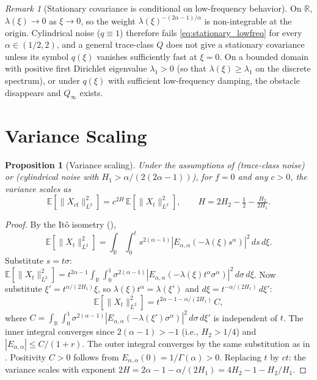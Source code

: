 \documentclass[11pt]{article}
\newtheorem{proposition}[theorem]{Proposition}
\theoremstyle{definition}
\theoremstyle{remark}
\newtheorem{remark}[theorem]{Remark}
\newcommand{\E}{\mathbb{E}}
\newcommand{\R}{\mathbb{R}}
\newcommand{\norm}[1]{\| #1 \|}
\begin{document}
\begin{remark}[Stationary covariance is conditional on
low-frequency behavior]
\label{rem:stationary_conditional}
On $\R$, $\lambda(\xi) \to 0$ as $\xi \to 0$, so the
weight $\lambda(\xi)^{-(2\alpha-1)/\alpha}$ is
non-integrable at the origin.
Cylindrical noise ($q \equiv 1$) therefore fails
\eqref{eq:stationary_lowfreq} for every
$\alpha \in (1/2, 2)$, and a general trace-class $Q$
does not give a stationary covariance unless its symbol
$q(\xi)$ vanishes sufficiently fast at $\xi = 0$.  On a
bounded domain with positive first Dirichlet eigenvalue
$\lambda_1 > 0$ (so that $\lambda(\xi) \geq \lambda_1$
on the discrete spectrum), or under $q(\xi)$ with
sufficient low-frequency damping, the obstacle
disappears and $Q_\infty$ exists.
\end{remark}

\section{Variance Scaling}\label{sec:scaling}

\begin{proposition}[Variance scaling]\label{thm:selfsimilar}
Under the assumptions of 
(trace-class noise) or 
(cylindrical noise with $H_1 > \alpha/(2(2\alpha-1))$),
for $f = 0$
and any $c > 0$, the variance scales as
\begin{equation}\label{eq:selfsimilar}
\E[\norm{X_{ct}}_{L^2}^2]
= c^{2H}\, \E[\norm{X_t}_{L^2}^2],
\qquad H = 2H_2 - \tfrac{1}{2} - \tfrac{H_2}{2H_1}.
\end{equation}
\end{proposition}

\begin{proof}
By the It\^o isometry (),
\[
\E[\norm{X_t}_{L^2}^2]
= \int_\R \int_0^t s^{2(\alpha-1)}
|E_{\alpha,\alpha}(-\lambda(\xi) s^\alpha)|^2\, ds\, d\xi.
\]
Substitute $s = t\sigma$:
$\E[\norm{X_t}_{L^2}^2]
= t^{2\alpha-1} \int_\R \int_0^1 \sigma^{2(\alpha-1)}
|E_{\alpha,\alpha}(-\lambda(\xi) t^\alpha
\sigma^\alpha)|^2\, d\sigma\, d\xi$.
Now substitute $\xi' = t^{\alpha/(2H_1)}\xi$, so
$\lambda(\xi) t^\alpha = \lambda(\xi')$ and
$d\xi = t^{-\alpha/(2H_1)}\,d\xi'$:
\[
\E[\norm{X_t}_{L^2}^2]
= t^{2\alpha - 1 - \alpha/(2H_1)}\,C,
\]
where $C = \int_\R \int_0^1 \sigma^{2(\alpha-1)}
|E_{\alpha,\alpha}(-\lambda(\xi')\sigma^\alpha)|^2\,
d\sigma\, d\xi'$ is independent of $t$.  The inner
integral converges since $2(\alpha-1) > -1$ (i.e.,
$H_2 > 1/4$) and $|E_{\alpha,\alpha}| \leq C/(1+r)$.
The outer integral converges by the same substitution
as in .  Positivity $C > 0$ follows
from $E_{\alpha,\alpha}(0) = 1/\Gamma(\alpha) > 0$.  Replacing $t$ by $ct$:
the variance scales with exponent
$2H = 2\alpha - 1 - \alpha/(2H_1)
= 4H_2 - 1 - H_2/H_1$.
\end{proof}
\end{document}
